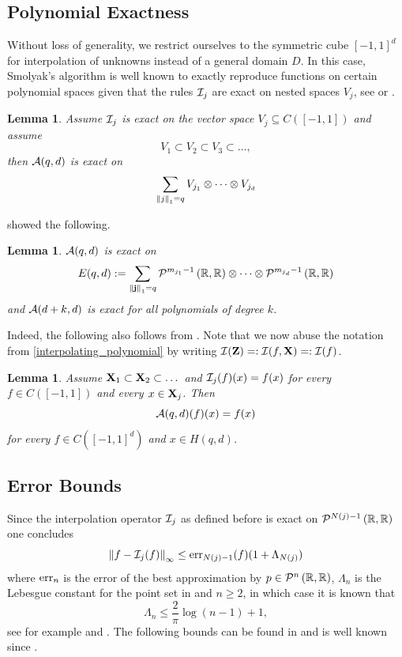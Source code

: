 \documentclass[12pt, oneside]{amsart}
\newtheorem{lem}[thm]{Lemma}
\theoremstyle{definition}
\theoremstyle{remark}
\numberwithin{equation}{section}
\begin{document}
\subsection{Polynomial Exactness}
Without loss of generality, we restrict ourselves to the symmetric cube \([-1, 
1]^d\)  for interpolation of unknowns instead of a 
general domain \(D\). In this 
case, Smolyak's algorithm is well known to exactly reproduce functions on 
certain polynomial spaces given that the rules \(\cI_j\) are exact on nested 
spaces \(V_j\), see \cite{DELVOS198299} or \cite{novakRitter1996}.
\begin{lem}
	Assume \(\cI_j\) is exact on the vector space \(V_j \subseteq C([-1, 1])\) and assume \[
		V_1 \subset V_2 \subset V_3 \subset \dots,
	\]
	then \(\cA(q, d)\) is exact on \[
		\sum_{\norm[1]{j}=q} V_{j_1} \otimes \cdots \otimes V_{j_d}
	\]
\end{lem}
\cite{BarthelmannHighDim_2000} showed the following. 
\begin{lem}
	\(\cA(q, d)\) is exact on \[
		E(q, d) \defn \sum_{\norm[1]{\bfj} = q} \pols[m_{j_1}-1]{\R, \R} \otimes \cdots \otimes \pols[m_{j_d}-1]{\R, \R}
	\]
	and \(\cA(d+k, d)\) is exact for all polynomials of degree \(k\).
\end{lem}
Indeed, the following also follows from \cite{BarthelmannHighDim_2000}. Note that we now abuse the notation from \ref{interpolating_polynomial} by writing \(\cI(\ZZ) \revdefn \cI(f, \XX) \revdefn \cI(f)\).
\begin{lem}
	Assume \(\XX_1 \subset \XX_2 \subset \dots\) and \(\cI_j(f)(x) = f(x)\) for every \(f \in C([-1, 1])\) and every \(x \in \XX_j\). Then \[
		\cA(q, d)(f)(x) = f(x)
	\]
	for every \(f \in C([-1, 1]^d)\) and \(x \in H(q, d)\).
\end{lem}

\subsection{Error Bounds}
Since the interpolation operator \(\cI_j\) as defined before is exact on \(\pols[N(j)-1]{\R, \R}\) one concludes \[
	\norm[\infty]{f - \cI_j(f)} \leq \err_{N(j)-1}(f)(1+\Lambda_{N(j)})
\]
where \(\err_n\) is the error of the best approximation by \(p \in \pols[n]{\R, \R}\), \(\Lambda_n\) is the Lebesgue constant for the point set in  and \(n \geq 2\), in which case it is known that \[
	\Lambda_n \leq \frac{2}{\pi} \log(n-1)+1,
\]
see for example \cite{zeller1966} and \cite{Dzjadyk1983}. The following bounds can be found in \cite{BarthelmannHighDim_2000} and is well known since \cite{smolyak1963, temlyakov1986, WASILKOWSKI19951}.
\end{document}

